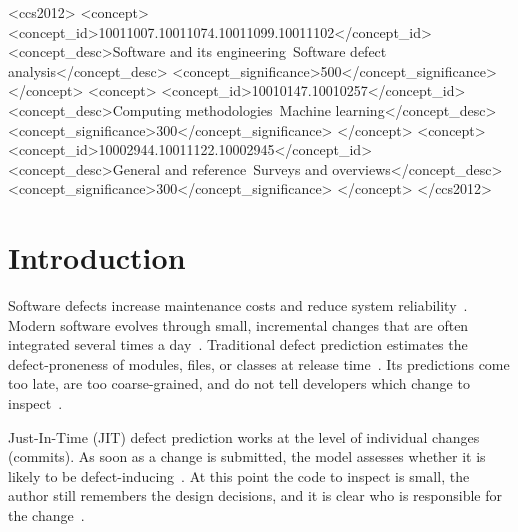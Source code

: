 \documentclass[sigconf,review]{acmart}
\begin{document}
\begin{CCSXML}
<ccs2012>
 <concept>
  <concept_id>10011007.10011074.10011099.10011102</concept_id>
  <concept_desc>Software and its engineering~Software defect analysis</concept_desc>
  <concept_significance>500</concept_significance>
 </concept>
 <concept>
  <concept_id>10010147.10010257</concept_id>
  <concept_desc>Computing methodologies~Machine learning</concept_desc>
  <concept_significance>300</concept_significance>
 </concept>
 <concept>
  <concept_id>10002944.10011122.10002945</concept_id>
  <concept_desc>General and reference~Surveys and overviews</concept_desc>
  <concept_significance>300</concept_significance>
 </concept>
</ccs2012>
\end{CCSXML}



\maketitle

\section{Introduction}
\label{S:introduction}

Software defects increase maintenance costs and reduce system reliability~\cite{boehm2001software, tassey2002economic}. Modern software evolves through small, incremental changes that are often integrated several times a day~\cite{hilton2016usage, shahin2017continuous}. Traditional defect prediction estimates the defect-proneness of modules, files, or classes at release time~\cite{hall2012systematic, radjenovic2013software}. Its predictions come too late, are too coarse-grained, and do not tell developers which change to inspect~\cite{kamei2013large}.

Just-In-Time (JIT) defect prediction works at the level of individual changes (commits). As soon as a change is submitted, the model assesses whether it is likely to be defect-inducing~\cite{mockus2000predicting, kim2008classifying, kamei2013large}. At this point the code to inspect is small, the author still remembers the design decisions, and it is clear who is responsible for the change~\cite{kamei2013large}.
\end{document}
